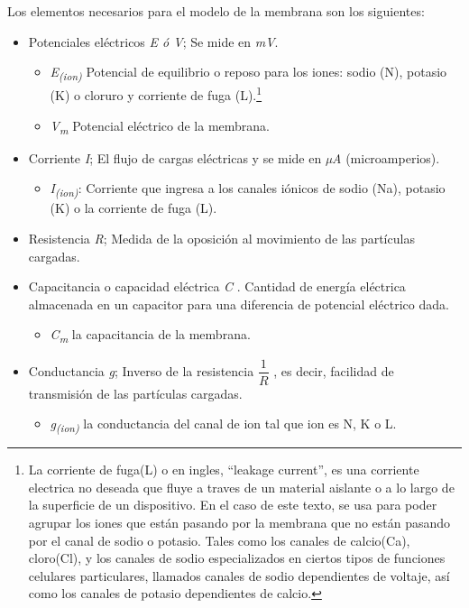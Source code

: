 Los elementos necesarios para el modelo de la membrana son los siguientes:
\begin{itemize}
\item Potenciales eléctricos \emph{E ó  V}; Se mide en \emph{mV}.
    \begin{itemize}
     \item \emph{E\textsubscript{(ion)}} 
     Potencial de equilibrio o reposo para los iones: sodio (N), potasio (K) o cloruro y corriente de fuga (L).\footnote{
        La corriente de fuga(L) o en ingles, ``leakage current'', es una corriente electrica no deseada que fluye a traves de un material aislante o a lo largo de la superficie de un dispositivo. En el caso de este texto, se usa para poder agrupar los iones que están pasando por la membrana que no están pasando por el canal de sodio o potasio. Tales como los canales de calcio(Ca), cloro(Cl), y los canales de sodio especializados en ciertos tipos de funciones celulares particulares, llamados canales de sodio dependientes de voltaje, así como los canales de potasio dependientes de calcio.
     } 

     \item \emph{V\textsubscript{m}} Potencial eléctrico de la membrana. 
     \end{itemize}

\item Corriente \emph{I}; El flujo de cargas eléctricas y se mide en \emph{µA} (microamperios).
    \begin{itemize}
     \item \emph{I\textsubscript{(ion)}}: Corriente que ingresa a los canales iónicos de sodio (Na), potasio (K) o la corriente de fuga (L).
     \end{itemize}

\item Resistencia \emph{R}; Medida de la oposición al movimiento de las partículas cargadas.
\item Capacitancia o capacidad eléctrica \emph{C} . Cantidad de energía eléctrica almacenada en un capacitor para una diferencia de potencial eléctrico dada.
    \begin{itemize}
     \item \emph{C\textsubscript{m}} la capacitancia de la membrana. 
     \end{itemize}

\item Conductancia \emph{g}; Inverso de la resistencia \( \dfrac{1}{R} \) , es decir, facilidad de transmisión de las partículas cargadas.
    \begin{itemize}
     \item \emph{g\textsubscript{(ion)}}  la conductancia del canal de ion tal que ion es N, K o L. 
     \end{itemize}

\end{itemize}


